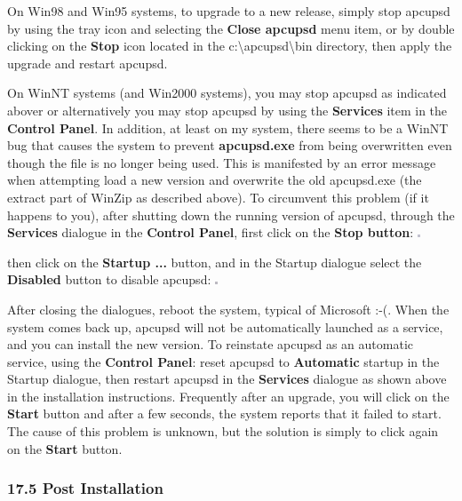 \label{index-Windows_002c-Upgrading-175}
\label{index-Upgrading-Windows-176}
On Win98 and Win95 systems, to upgrade to a new release, simply stop apcupsd
by using the tray icon and selecting the {\bf Close apcupsd} menu item, or by
double clicking on the {\bf Stop} icon located in the
c:\textbackslash{}apcupsd\textbackslash{}bin directory, then apply the upgrade
and restart apcupsd.  

On WinNT systems (and Win2000 systems), you may stop apcupsd as indicated
abover or alternatively you may stop apcupsd by using the {\bf Services} item
in the {\bf Control Panel}. In addition, at least on my system, there seems to
be a WinNT bug that causes the system to prevent {\bf apcupsd.exe} from being
overwritten even though the file is no longer being used.  This is manifested
by an error message when attempting load a new version and overwrite the old
apcupsd.exe (the extract part of WinZip as described above). To circumvent
this problem (if it happens to you), after shutting down the running version
of apcupsd, through the {\bf Services} dialogue in the {\bf Control Panel},
first click on the {\bf Stop button}:  \includegraphics{./wininstall6.eps}  

then click on the {\bf Startup ...} button, and in the Startup dialogue select
the {\bf Disabled} button to disable apcupsd: 
\includegraphics{./wininstall7.eps}  

After closing the dialogues, reboot the system, typical of Microsoft :-(. When
the system comes back up, apcupsd will not be automatically launched as a
service, and you can install the new version. To reinstate apcupsd as an
automatic service, using the {\bf Control Panel}: reset apcupsd to {\bf
Automatic} startup in the Startup dialogue, then restart apcupsd in the {\bf
Services} dialogue as shown above in the installation instructions. Frequently
after an upgrade, you will click on the {\bf Start} button and after a few
seconds, the system reports that it failed to start. The cause of this problem
is unknown, but the solution is simply to click again on the {\bf Start}
button. 

\label{Post-Installation}

\subsubsection*{17.5 Post Installation}

